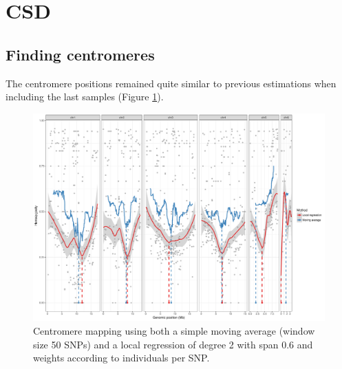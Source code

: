 \documentclass[10pt,a4paper]{report}
\begin{document}
\section{CSD}
\subsection{Finding centromeres}
The centromere positions remained quite similar to previous estimations when including the last samples (Figure \ref{C_centro}).
\begin{figure}[h!]
\begin{center}
\includegraphics[width=\textwidth]{final_samples/final_centro.pdf}
\caption{Centromere mapping using both a simple moving average (window size 50 SNPs) and a local regression of degree 2 with span 0.6 and weights according to individuals per SNP.}
\label{C_centro}
\end{center}
\end{figure}
\FloatBarrier
\end{document}
